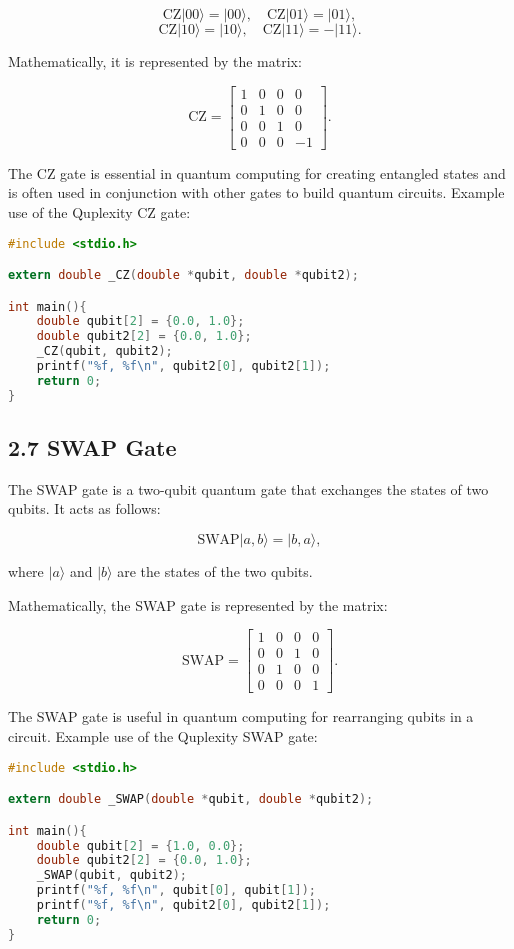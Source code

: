 \documentclass{article}
\begin{document}
\[
\text{CZ}|00\rangle = |00\rangle, \quad \text{CZ}|01\rangle = |01\rangle,
\]
\[
\text{CZ}|10\rangle = |10\rangle, \quad \text{CZ}|11\rangle = -|11\rangle.
\]

Mathematically, it is represented by the matrix:

\[
\text{CZ} = \begin{bmatrix}
1 & 0 & 0 & 0 \\
0 & 1 & 0 & 0 \\
0 & 0 & 1 & 0 \\
0 & 0 & 0 & -1
\end{bmatrix}.
\]

The CZ gate is essential in quantum computing for creating entangled states and is often used in conjunction with other gates to build quantum circuits.
Example use of the Quplexity CZ gate:

\begin{lstlisting}[language=C, frame=single]
#include <stdio.h>

extern double _CZ(double *qubit, double *qubit2);

int main(){
    double qubit[2] = {0.0, 1.0};
    double qubit2[2] = {0.0, 1.0};
    _CZ(qubit, qubit2);
    printf("%f, %f\n", qubit2[0], qubit2[1]);
    return 0;
}
\end{lstlisting}

\subsection*{2.7 SWAP Gate}
The SWAP gate is a two-qubit quantum gate that exchanges the states of two qubits. It acts as follows:

\[
\text{SWAP}|a, b\rangle = |b, a\rangle,
\]

where \(|a\rangle\) and \(|b\rangle\) are the states of the two qubits.

Mathematically, the SWAP gate is represented by the matrix:

\[
\text{SWAP} = \begin{bmatrix}
1 & 0 & 0 & 0 \\
0 & 0 & 1 & 0 \\
0 & 1 & 0 & 0 \\
0 & 0 & 0 & 1
\end{bmatrix}.
\]

The SWAP gate is useful in quantum computing for rearranging qubits in a circuit.
Example use of the Quplexity SWAP gate:

\begin{lstlisting}[language=C, frame=single]
#include <stdio.h>

extern double _SWAP(double *qubit, double *qubit2);

int main(){
    double qubit[2] = {1.0, 0.0};
    double qubit2[2] = {0.0, 1.0};
    _SWAP(qubit, qubit2);
    printf("%f, %f\n", qubit[0], qubit[1]);
    printf("%f, %f\n", qubit2[0], qubit2[1]);
    return 0;
}
\end{lstlisting}
\end{document}

